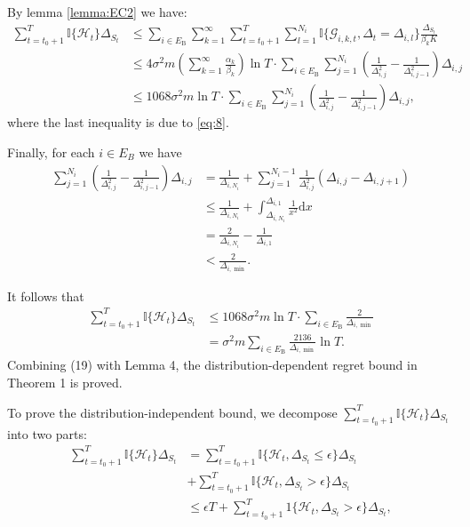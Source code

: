 \documentclass[opre,sglanonrev]{informs4}
\begin{document}
By lemma \ref{lemma:EC2} we have:
$$\begin{aligned}
 \sum_{t=t_0+1}^T\mathbb{I}\{\mathcal{H}_t\}\Delta_{S_t}&\leq\sum_{i\in E_\mathrm{B}}\sum_{k=1}^\infty\sum_{t=t_0+1}^T\sum_{l=1}^{N_i}\mathbb{I}\{\mathcal{G}_{i,k,t},\Delta_t=\Delta_{i,l}\}\frac{\Delta_{S_t}}{\beta_kK} \\
 & \leq 4\sigma^2m\left(\sum_{k=1}^\infty\frac{\alpha_k}{\beta_k}\right)\ln T\cdot\sum_{i\in E_{\mathrm{B}}}\sum_{j=1}^{N_i}\left(\frac{1}{\Delta_{i,j}^2}-\frac{1}{\Delta_{i,j-1}^2}\right)\Delta_{i,j}\\
 & \leq1068\sigma^2m\ln T\cdot\sum_{i\in E_{\mathrm{B}}}\sum_{j=1}^{N_i}\left(\frac{1}{\Delta_{i,j}^2}-\frac{1}{\Delta_{i,j-1}^2}\right)\Delta_{i,j},
\end{aligned}$$
where the last inequality is due to \ref{eq:8}.

Finally, for each $i\in E_B$ we have 
$$\begin{aligned}
\sum_{j=1}^{N_i}\left(\frac{1}{\Delta_{i,j}^2}-\frac{1}{\Delta_{i,j-1}^2}\right)\Delta_{i,j} & =\frac{1}{\Delta_{i,N_i}}+\sum_{j=1}^{N_i-1}\frac{1}{\Delta_{i,j}^2}(\Delta_{i,j}-\Delta_{i,j+1}) \\
 & \leq\frac{1}{\Delta_{i,N_i}}+\int_{\Delta_{i,N_i}}^{\Delta_{i,1}}\frac{1}{x^2}\mathrm{d}x \\
 & =\frac{2}{\Delta_{i,N_i}}-\frac{1}{\Delta_{i,1}} \\
 & <\frac{2}{\Delta_{i,\min}}.
\end{aligned}$$

It follows that 
\begin{equation}
	\begin{aligned}
	\sum_{t=t_0+1}^T\mathbb{I}\{\mathcal{H}_t\}\Delta_{S_t}&\leq1068\sigma^2m\ln T\cdot\sum_{i\in E_\mathrm{B}}\frac{2}{\Delta_{i,\min}}\\
	&=\sigma^2m\sum_{i\in E_\mathrm{B}}\frac{2136}{\Delta_{i,\min}}\ln T.
	\end{aligned}
\end{equation}
Combining (19) with Lemma 4, the distribution-dependent regret bound in Theorem 1 is proved.

To prove the distribution-independent bound, we decompose $\sum_{t=t_0+1}^T\mathbb{I}\{\mathcal{H}_t\}\Delta_{S_t}$ into two parts:
\begin{equation}\begin{aligned}
\sum_{t=t_0+1}^T\mathbb{I}\{\mathcal{H}_t\}\Delta_{S_t}&=\sum_{t=t_0+1}^T\mathbb{I}\{\mathcal{H}_t,\Delta_{S_t}\leq\epsilon\}\Delta_{S_t}\\
&+\sum_{t=t_0+1}^T\mathbb{I}\{\mathcal{H}_t,\Delta_{S_t}>\epsilon\}\Delta_{S_t}\\
&\leq\epsilon T+\sum_{t=t_0+1}^T1\{\mathcal{H}_t,\Delta_{S_t}>\epsilon\}\Delta_{S_t},
\end{aligned}\end{equation}
\end{document}
